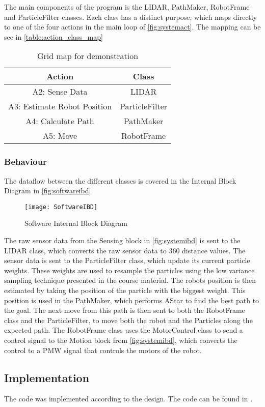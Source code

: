 \documentclass[Main]{subfiles}
\begin{document}
		The main components of the program is the LIDAR, PathMaker, RobotFrame and ParticleFilter classes. 
		Each class has a distinct purpose, which maps directly to one of the four  actions in the main loop of \autoref{fig:systemact}.
		The mapping can be see in \autoref{table:action_class_map}
		 
		\begin{table}[H]
			\centering
			\begin{tabular}{|c|c|}
			\hline
				Action & Class \\ 
			\hline
				A2: Sense Data & LIDAR  \\ 
			\hline
				A3: Estimate Robot Position & ParticleFilter  \\ 
			\hline
				A4: Calculate Path & PathMaker  \\ 
			\hline
				A5: Move & RobotFrame  \\ 
			\hline
			\end{tabular}
			\caption{Grid map for demonstration}
			\label{table:action_class_map} 
		\end{table} \noindent
		
	\subsubsection{Behaviour} %
	\label{subsub:software_behaviour}
	
		The dataflow between the different classes is covered in the Internal Block Diagram in \autoref{fig:softwareibd}
		
		\begin{figure}[H]
			\centering
			\texttt{[image: SoftwareIBD]}
			\caption{Software Internal Block Diagram}
			\label{fig:softwareibd}
		\end{figure}

		The raw sensor data from the Sensing block in \autoref{fig:systemibd} is sent to the LIDAR class, which  converts the raw sensor data to 360 distance values.
		The sensor data is sent to the ParticleFilter class, which update its current particle weights. 
		These weights are used to resample the particles using the low variance sampling technique presented in the course material.
		The robots position is then estimated by taking the position of the particle with the biggest weight.
		This position is used in the PathMaker, which performs AStar to find the best path to the goal. The next move from this path is then sent to both the RobotFrame class and the ParticleFilter, to move both the robot and the Particles along the expected path.
		The RobotFrame class uses the MotorControl class to send a control signal to the Motion block from \autoref{fig:systemibd}, which converts the control to a PMW signal that controls the motors of the robot.
	
	\subsection{Implementation} %
	\label{sub:software_implementation}
	
	The code was implemented according to the design. The code can be found in .
	
\end{document}
